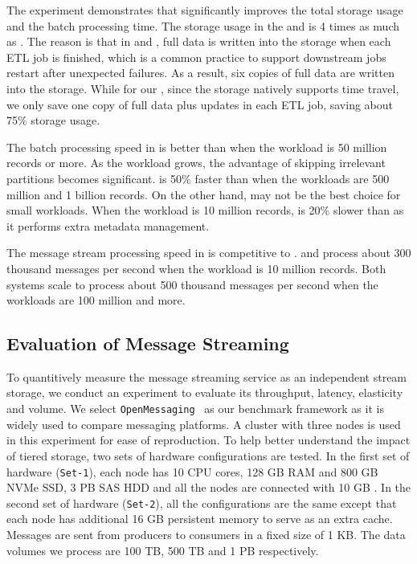 The experiment demonstrates that \sys significantly improves the total storage usage and the batch processing time. The storage usage in the \hdfs and \kafka  is 4 times as much as \sys. The reason is that in \hdfs and \kafka, full data is written into the storage when each ETL job is finished, which is a common practice to support downstream jobs restart after unexpected failures. As a result, six copies of full data are written into the storage. While for our \sys, since the storage natively supports time travel, we only save one copy of full data plus updates in each ETL job, saving about 75\% storage usage.


The batch processing speed in \sys is better than \hdfs when the workload is 50 million records or more.  As the workload grows, the advantage of skipping irrelevant partitions becomes significant. \sys is 50\% faster than \hdfs when the workloads are 500 million and 1 billion records. On the other hand, \sys may not be the best choice for small workloads. When the workload is 10 million records, \sys is 20\% slower than \hdfs as it performs extra metadata management.





The message stream processing speed in \sys is competitive to \kafka. \sys and \kafka process about 300 thousand messages per second when the workload is 10 million records. Both systems scale to process about 500 thousand messages per second when the workloads are 100 million and more. 


\subsection{Evaluation of Message Streaming}

To quantitively measure the message streaming service as an independent stream storage, we conduct an experiment to evaluate its throughput, latency, elasticity and volume. We select \texttt{OpenMessaging}~\cite{} as our benchmark framework as it is widely used to compare messaging platforms. A cluster with three nodes is used in this experiment for  ease of reproduction.
 To help better understand the impact of tiered storage, two sets of hardware configurations are tested. In the first set of hardware (\texttt{Set-1}), each node has 10 CPU cores, 128 GB RAM and 800 GB NVMe SSD, 3 PB SAS HDD and all the nodes are connected with 10 GB . In the second set of hardware (\texttt{Set-2}), all the configurations are the same except that each node has additional 16 GB persistent memory to serve as an extra cache. Messages are sent from producers to consumers in a fixed size of 1 KB. The data volumes we process are 100 TB, 500 TB and 1 PB respectively. 


